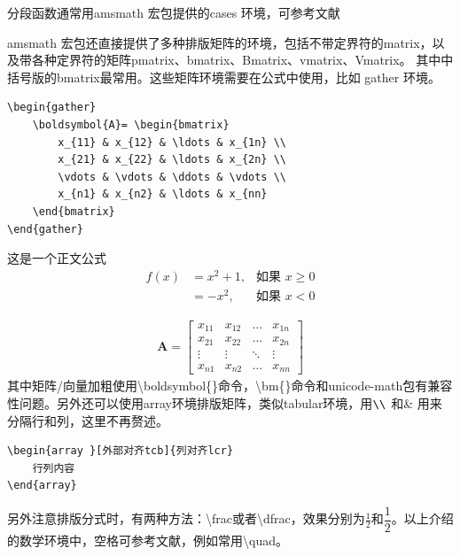 分段函数通常用amsmath 宏包提供的cases 环境，可参考文献\parencite{_c}

amsmath 宏包还直接提供了多种排版矩阵的环境，包括不带定界符的matrix，以及带各种定界符的矩阵pmatrix、bmatrix、Bmatrix、vmatrix、Vmatrix。
其中中括号版的bmatrix最常用。这些矩阵环境需要在公式中使用，比如 gather 环境。
\begin{lstlisting}
\begin{gather}
	\boldsymbol{A}= \begin{bmatrix}
		x_{11} & x_{12} & \ldots & x_{1n} \\
		x_{21} & x_{22} & \ldots & x_{2n} \\
		\vdots & \vdots & \ddots & \vdots \\
		x_{n1} & x_{n2} & \ldots & x_{nn}
	\end{bmatrix}
\end{gather}
\end{lstlisting}
这是一个正文公式
\begin{equation}
	\begin{aligned}
		f(x) & = x^2 + 1, & \text{如果 } x \geq 0 \\
		     & = -x^2,    & \text{如果 } x < 0
	\end{aligned}
\end{equation}

\begin{gather}
	\boldsymbol{A}= \begin{bmatrix}
		x_{11} & x_{12} & \ldots & x_{1n} \\
		x_{21} & x_{22} & \ldots & x_{2n} \\
		\vdots & \vdots & \ddots & \vdots \\
		x_{n1} & x_{n2} & \ldots & x_{nn}
	\end{bmatrix}
\end{gather}
其中矩阵/向量加粗使用\textbackslash{}boldsymbol\{\}命令，\textbackslash{}bm\{\}命令和unicode-math包有兼容性问题。另外还可以使用array环境排版矩阵，类似tabular环境，用$ \verb|\\|$ 和\& 用来分隔行和列，这里不再赘述。
\begin{lstlisting}
\begin{array }[外部对齐tcb]{列对齐lcr}
	行列内容
\end{array}
\end{lstlisting}

另外注意排版分式时，有两种方法：\textbackslash{}frac或者\textbackslash{}dfrac，效果分别为$ \frac{1}{2} $和$ \dfrac{1}{2} $。以上介绍的数学环境中，空格可参考文献\parencite{_c}，例如常用\textbackslash{}quad。

